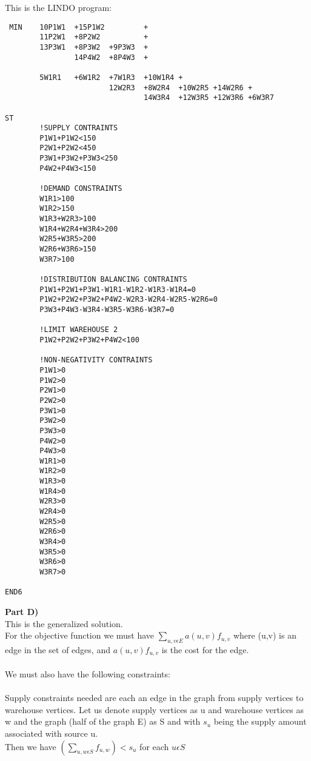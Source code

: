 \documentclass[12pt]{report}
\begin{document}
This is the LINDO program:\\
\begin{verbatim}
 MIN    10P1W1  +15P1W2         +
        11P2W1  +8P2W2          +
        13P3W1  +8P3W2  +9P3W3  +
                14P4W2  +8P4W3  +
        
        5W1R1   +6W1R2  +7W1R3  +10W1R4 +
                        12W2R3  +8W2R4  +10W2R5 +14W2R6 +
                                14W3R4  +12W3R5 +12W3R6 +6W3R7

ST
        !SUPPLY CONTRAINTS
        P1W1+P1W2<150
        P2W1+P2W2<450
        P3W1+P3W2+P3W3<250
        P4W2+P4W3<150

        !DEMAND CONSTRAINTS
        W1R1>100
        W1R2>150
        W1R3+W2R3>100
        W1R4+W2R4+W3R4>200
        W2R5+W3R5>200
        W2R6+W3R6>150
        W3R7>100        

        !DISTRIBUTION BALANCING CONTRAINTS
        P1W1+P2W1+P3W1-W1R1-W1R2-W1R3-W1R4=0
        P1W2+P2W2+P3W2+P4W2-W2R3-W2R4-W2R5-W2R6=0
        P3W3+P4W3-W3R4-W3R5-W3R6-W3R7=0

        !LIMIT WAREHOUSE 2
        P1W2+P2W2+P3W2+P4W2<100

        !NON-NEGATIVITY CONTRAINTS
        P1W1>0
        P1W2>0
        P2W1>0
        P2W2>0
        P3W1>0
        P3W2>0
        P3W3>0
        P4W2>0
        P4W3>0
        W1R1>0
        W1R2>0
        W1R3>0
        W1R4>0
        W2R3>0
        W2R4>0
        W2R5>0
        W2R6>0
        W3R4>0
        W3R5>0
        W3R6>0
        W3R7>0

END6
\end{verbatim}

\textbf{Part D)}\\
This is the generalized solution.\\
For the objective function we must have $\sum\limits_{u,v\epsilon E} a(u,v)f_{u,v}$ where (u,v) is an edge in the set
of edges, and $a(u,v)f_{u,v}$ is the cost for the edge.\\
\\
We must also have the following constraints:\\ 
\\
Supply constraints needed are each an edge in the graph from supply vertices to warehouse vertices.  Let us denote supply vertices as
u and warehouse vertices as w and the graph (half of the graph E) as S and with $s_u$ being the supply amount associated with source u.\\
Then we have $(\sum\limits_{u,w\epsilon S} f_{u,w})<s_u$ for each $u \epsilon S$
\end{document}
